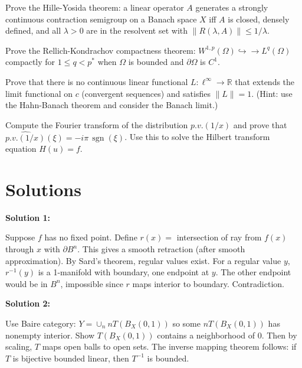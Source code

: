 \documentclass[12pt,a4paper]{exam}
\begin{document}
\begin{questions}
\vspace{0.3cm}

\question[6]
Prove the Hille-Yosida theorem: a linear operator $A$ generates a strongly continuous contraction semigroup on a Banach space $X$ iff $A$ is closed, densely defined, and all $\lambda > 0$ are in the resolvent set with $\|R(\lambda,A)\| \leq 1/\lambda$.

\vspace{0.3cm}

\question[2]
Prove the Rellich-Kondrachov compactness theorem: $W^{1,p}(\Omega) \hookrightarrow\!\!\!\to L^q(\Omega)$ compactly for $1 \leq q < p^*$ when $\Omega$ is bounded and $\partial\Omega$ is $C^1$.

\vspace{0.3cm}

\question[5]
Prove that there is no continuous linear functional $L: \ell^\infty \to \mathbb{R}$ that extends the limit functional on $c$ (convergent sequences) and satisfies $\|L\| = 1$. (Hint: use the Hahn-Banach theorem and consider the Banach limit.)

\vspace{0.3cm}

\question[4]
Compute the Fourier transform of the distribution $p.v.(1/x)$ and prove that $\widehat{p.v.(1/x)}(\xi) = -i\pi \, \operatorname{sgn}(\xi)$. Use this to solve the Hilbert transform equation $H(u) = f$.

\vspace{0.3cm}

\end{questions}

\newpage
\section*{Solutions}

\textbf{Solution 1:}

Suppose $f$ has no fixed point. Define $r(x) =$ intersection of ray from $f(x)$ through $x$ with $\partial B^n$. This gives a smooth retraction (after smooth approximation). By Sard's theorem, regular values exist. For a regular value $y$, $r^{-1}(y)$ is a 1-manifold with boundary, one endpoint at $y$. The other endpoint would be in $B^n$, impossible since $r$ maps interior to boundary. Contradiction.

\vspace{0.5cm}

\textbf{Solution 2:}

Use Baire category: $Y = \cup_n n T(B_X(0,1))$ so some $nT(B_X(0,1))$ has nonempty interior. Show $T(B_X(0,1))$ contains a neighborhood of 0. Then by scaling, $T$ maps open balls to open sets. The inverse mapping theorem follows: if $T$ is bijective bounded linear, then $T^{-1}$ is bounded.
\end{document}
